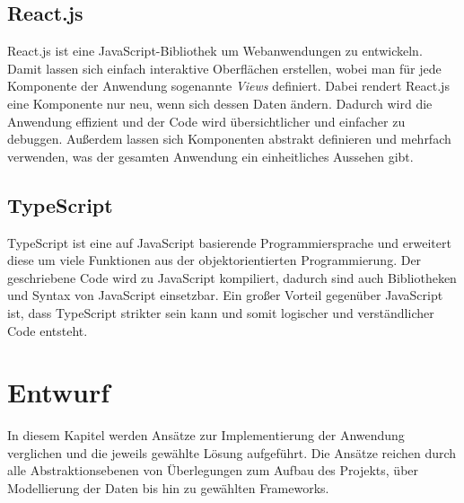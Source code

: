 \documentclass[12pt,twoside,a4paper]{article}
\begin{document}
\begin{sloppypar}
\subsection{React.js}\label{sec:react}
React.js ist eine JavaScript-Bibliothek um Webanwendungen zu entwickeln. Damit lassen sich einfach interaktive Oberflächen erstellen, wobei man für jede Komponente der Anwendung sogenannte \textit{Views} definiert. Dabei rendert React.js eine Komponente nur neu, wenn sich dessen Daten ändern. Dadurch wird die Anwendung effizient und der Code wird übersichtlicher und einfacher zu debuggen. Außerdem lassen sich Komponenten abstrakt definieren und mehrfach verwenden, was der gesamten Anwendung ein einheitliches Aussehen gibt. \cite{react}
\subsection{TypeScript}\label{sec:typescript}
TypeScript ist eine auf JavaScript basierende Programmiersprache und erweitert diese um viele Funktionen aus der objektorientierten Programmierung. Der geschriebene Code wird zu JavaScript kompiliert, dadurch sind auch Bibliotheken und Syntax von JavaScript einsetzbar. Ein großer Vorteil gegenüber JavaScript ist, dass TypeScript strikter sein kann und somit logischer und verständlicher Code entsteht. \cite{ts-vs-js}
\newpage
\section{Entwurf}
In diesem Kapitel werden Ansätze zur Implementierung der Anwendung verglichen und die jeweils gewählte Lösung aufgeführt. Die Ansätze reichen durch alle Abstraktionsebenen von Überlegungen zum Aufbau des Projekts, über Modellierung der Daten bis hin zu gewählten Frameworks.

\end{sloppypar}
\end{document}
